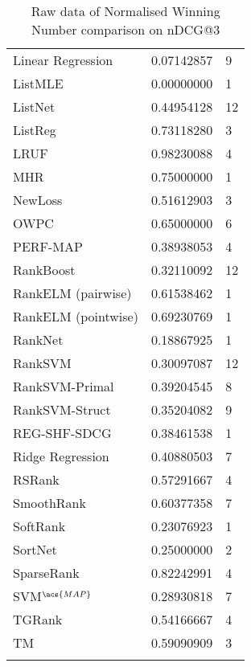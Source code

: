 \begin{longtable}{l|l|l}
Linear Regression & 0.07142857 & 9 \\ 
List\acs{MLE} & 0.00000000 & 1 \\ 
ListNet & 0.44954128 & 12 \\ 
ListReg & 0.73118280 & 3 \\ 
LRUF & 0.98230088 & 4 \\ 
MHR & 0.75000000 & 1 \\ 
NewLoss & 0.51612903 & 3 \\ 
OWPC & 0.65000000 & 6 \\ 
PERF-\acs{MAP} & 0.38938053 & 4 \\ 
RankBoost & 0.32110092 & 12 \\ 
RankELM (pairwise) & 0.61538462 & 1 \\ 
RankELM (pointwise) & 0.69230769 & 1 \\ 
RankNet & 0.18867925 & 1 \\ 
Rank\acs{SVM} & 0.30097087 & 12 \\ 
Rank\acs{SVM}-Primal & 0.39204545 & 8 \\ 
Rank\acs{SVM}-Struct & 0.35204082 & 9 \\ 
REG-SHF-SDCG & 0.38461538 & 1 \\ 
Ridge Regression & 0.40880503 & 7 \\ 
RSRank & 0.57291667 & 4 \\ 
SmoothRank & 0.60377358 & 7 \\ 
SoftRank & 0.23076923 & 1 \\ 
SortNet & 0.25000000 & 2 \\ 
SparseRank & 0.82242991 & 4 \\ 
\acs{SVM}$^{\acs{MAP}}$ & 0.28930818 & 7 \\ 
TGRank & 0.54166667 & 4 \\ 
TM & 0.59090909 & 3 \\
\caption{Raw data of Normalised Winning Number comparison on \acs{nDCG}@3}
\label{tab:raw_data_norm_winnum_ndcg3}
\end{longtable}